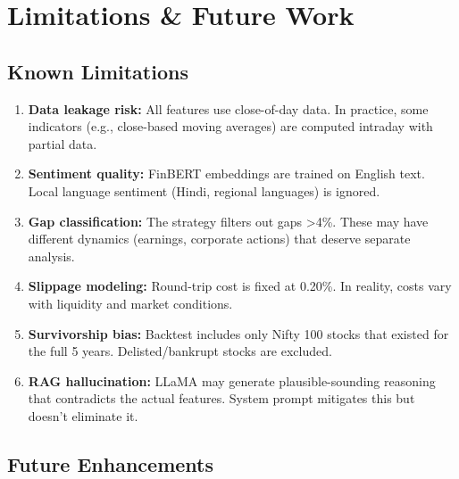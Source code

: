 \documentclass[11pt,a4paper]{article}
\begin{document}
\section{Limitations \& Future Work}

\subsection{Known Limitations}

\begin{enumerate}
    \item \textbf{Data leakage risk:} All features use close-of-day data. In practice, some indicators (e.g., close-based moving averages) are computed intraday with partial data.

    \item \textbf{Sentiment quality:} FinBERT embeddings are trained on English text. Local language sentiment (Hindi, regional languages) is ignored.

    \item \textbf{Gap classification:} The strategy filters out gaps >4\%. These may have different dynamics (earnings, corporate actions) that deserve separate analysis.

    \item \textbf{Slippage modeling:} Round-trip cost is fixed at 0.20\%. In reality, costs vary with liquidity and market conditions.

    \item \textbf{Survivorship bias:} Backtest includes only Nifty 100 stocks that existed for the full 5 years. Delisted/bankrupt stocks are excluded.

    \item \textbf{RAG hallucination:} LLaMA may generate plausible-sounding reasoning that contradicts the actual features. System prompt mitigates this but doesn't eliminate it.
\end{enumerate}

\subsection{Future Enhancements}
\end{document}
